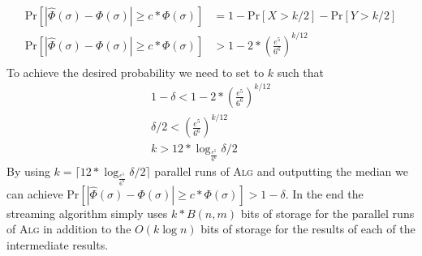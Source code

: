 \begin{enumerate}[(i)]
\[\begin{split}
\text{Pr}[|\hat{\Phi}(\sigma) - \Phi(\sigma)| \geq c * \Phi(\sigma)] &= 1 - \text{Pr}[X > k/2] - \text{Pr}[Y > k/2]\\
\text{Pr}[|\hat{\Phi}(\sigma) - \Phi(\sigma)| \geq c * \Phi(\sigma)] &> 1 - 2 *  (\frac{e^5}{6^6})^{k/12}\\
\end{split}
\]
To achieve the desired probability we need to set to $k$ such that 
\[
\begin{split}
1 - \delta < 1 - 2 *  (\frac{e^5}{6^6})^{k/12}\\
\delta/2 < (\frac{e^5}{6^6})^{k/12}\\
k > 12 * \log_{\frac{e^5}{6^6}}{\delta/2}
\end{split}
\]
By using $k = \lceil 12 * \log_{\frac{e^5}{6^6}}{\delta/2} \rceil$ parallel runs of \textsc{Alg} and outputting the median we can achieve $\text{Pr}[|\hat{\Phi}(\sigma) - \Phi(\sigma)| \geq c * \Phi(\sigma)] > 1 - \delta$.
In the end the streaming algorithm simply uses $k * B(n,m)$ bits of storage for the parallel runs of \textsc{Alg} in addition to the $O(k \log{n})$ bits of storage for the results of each of the intermediate results.
\end{enumerate}
